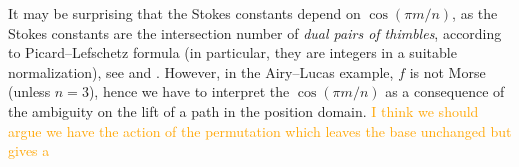 \documentclass{article}
\newcommand{\laplace}{\mathcal{L}}
\theoremstyle{definition}
\theoremstyle{plain}
\begin{document}
It may be surprising that the Stokes constants depend on $\cos(\pi m/n)$, as the Stokes constants are the intersection number of \textit{dual pairs of thimbles}, according to Picard--Lefschetz formula (in particular, they are integers in a suitable normalization), see \cite[Section 5]{pham} and \cite[Chapter ??]{Arnold}. However, in the Airy--Lucas example, $f$ is not Morse (unless $n=3$), hence we have to interpret the $\cos(\pi m/n)$ as a consequence of the ambiguity on the lift of a path in the position domain. \textcolor{orange}{ I think we should argue we have the action of the permutation which leaves the base unchanged but gives a } 






\end{document}

